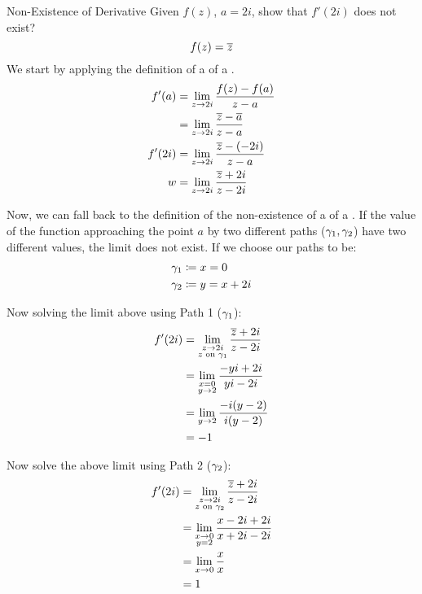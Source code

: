 \begin{example}[Lecture 5]{Non-Existence of Derivative}
  Given $f(z)$, $a = 2i$, show that $f'(2i)$ does not exist?
  \begin{equation*}
    f(z) = \overline{z}
  \end{equation*}
  \tcblower{}
  We start by applying the definition of a  of a .
  \begin{align*}
    f'(a) &= \lim\limits_{z \to 2i} \frac{f(z) - f(a)}{z - a} \\
          &= \lim\limits_{z \to 2i} \frac{\overline{z} - \overline{a}}{z - a} \\
    f'(2i) &= \lim\limits_{z \to 2i} \frac{\overline{z} - (-2i)}{z - a} \\w
          &= \lim\limits_{z \to 2i} \frac{\overline{z} + 2i}{z - 2i} \\
  \end{align*}

  Now, we can fall back to the definition of the non-existence of a  of a .
  If the value of the function approaching the point $a$ by two different paths ($\gamma_{1}, \gamma_{2}$) have two different values, the limit does not exist.
  If we choose our paths to be:
  \begin{align*}
    \gamma_{1} &\coloneqq x = 0 \\
    \gamma_{2} &\coloneqq y = x + 2i
  \end{align*}

  Now solving the limit above using Path 1 ($\gamma_{1}$):
  \begin{align*}
    f'(2i) &= \lim\limits_{\substack{z \to 2i \\ z \text{ on } \gamma_{1}}} \frac{\overline{z} + 2i}{z - 2i} \\
           &= \lim\limits_{\substack{x = 0 \\ y \to 2}} \frac{-yi + 2i}{yi - 2i} \\
           &= \lim\limits_{y \to 2} \frac{-i (y-2)}{i (y-2)} \\
           &= -1
  \end{align*}

  Now solve the above limit using Path 2 ($\gamma_{2}$):
  \begin{align*}
    f'(2i) &= \lim\limits_{\substack{z \to 2i \\ z \text{ on } \gamma_{2}}} \frac{\overline{z} + 2i}{z - 2i} \\
           &= \lim\limits_{\substack{x \to 0 \\ y = 2}} \frac{x-2i+2i}{x+2i-2i} \\
           &= \lim\limits_{\substack{x \to 0}} \frac{x}{x} \\
           &= 1
  \end{align*}


\end{example}
